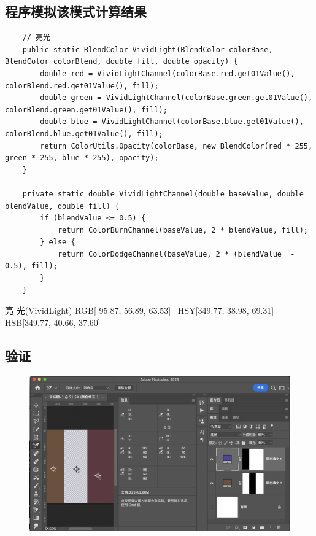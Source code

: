 \subsection{ 程序模拟该模式计算结果}
\begin{lstlisting}
	// 亮光
	public static BlendColor VividLight(BlendColor colorBase, BlendColor colorBlend, double fill, double opacity) {
		double red = VividLightChannel(colorBase.red.get01Value(), colorBlend.red.get01Value(), fill);
		double green = VividLightChannel(colorBase.green.get01Value(), colorBlend.green.get01Value(), fill);
		double blue = VividLightChannel(colorBase.blue.get01Value(), colorBlend.blue.get01Value(), fill);
		return ColorUtils.Opacity(colorBase, new BlendColor(red * 255, green * 255, blue * 255), opacity);
	}
	
	private static double VividLightChannel(double baseValue, double blendValue, double fill) {
		if (blendValue <= 0.5) {
			return ColorBurnChannel(baseValue, 2 * blendValue, fill);
		} else {
			return ColorDodgeChannel(baseValue, 2 * (blendValue  - 0.5), fill);
		}
	}
\end{lstlisting}



\begin{result}
\item 亮    光(VividLight)    RGB[ 95.87,  56.89,  63.53]~ HSY[349.77,  38.98,  69.31]~ HSB[349.77,  40.66,  37.60]
\end{result}


\subsection{ 验证}
\begin{figure}[h!]
	\centering
	\includegraphics[width=\linewidth]{figure/vividlight}
	\caption{}
	\label{fig:vividlight}
\end{figure}


